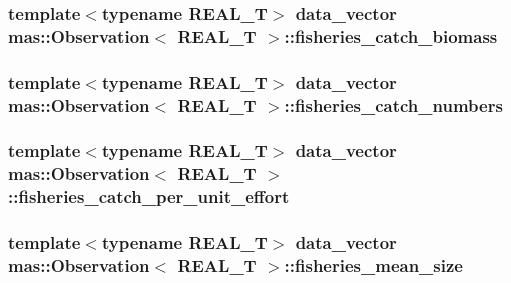 \subsubsection[{fisheries\+\_\+catch\+\_\+biomass}]{\setlength{\rightskip}{0pt plus 5cm}template$<$typename R\+E\+A\+L\+\_\+\+T$>$ data\+\_\+vector {\bf mas\+::\+Observation}$<$ R\+E\+A\+L\+\_\+\+T $>$\+::fisheries\+\_\+catch\+\_\+biomass}\label{classmas_1_1_observation_ace6a30e80477280a5f6f18b79761fb93}
\hypertarget{classmas_1_1_observation_a5ce77924f9fbb0e384ea94d4a0fa224c}{}
\subsubsection[{fisheries\+\_\+catch\+\_\+numbers}]{\setlength{\rightskip}{0pt plus 5cm}template$<$typename R\+E\+A\+L\+\_\+\+T$>$ data\+\_\+vector {\bf mas\+::\+Observation}$<$ R\+E\+A\+L\+\_\+\+T $>$\+::fisheries\+\_\+catch\+\_\+numbers}\label{classmas_1_1_observation_a5ce77924f9fbb0e384ea94d4a0fa224c}
\hypertarget{classmas_1_1_observation_a0aca199b27283dc8d0902dd42e2babc0}{}
\subsubsection[{fisheries\+\_\+catch\+\_\+per\+\_\+unit\+\_\+effort}]{\setlength{\rightskip}{0pt plus 5cm}template$<$typename R\+E\+A\+L\+\_\+\+T$>$ data\+\_\+vector {\bf mas\+::\+Observation}$<$ R\+E\+A\+L\+\_\+\+T $>$\+::fisheries\+\_\+catch\+\_\+per\+\_\+unit\+\_\+effort}\label{classmas_1_1_observation_a0aca199b27283dc8d0902dd42e2babc0}
\hypertarget{classmas_1_1_observation_a5606497a42c83ac55f64f48021c8fa3e}{}
\subsubsection[{fisheries\+\_\+mean\+\_\+size}]{\setlength{\rightskip}{0pt plus 5cm}template$<$typename R\+E\+A\+L\+\_\+\+T$>$ data\+\_\+vector {\bf mas\+::\+Observation}$<$ R\+E\+A\+L\+\_\+\+T $>$\+::fisheries\+\_\+mean\+\_\+size}\label{classmas_1_1_observation_a5606497a42c83ac55f64f48021c8fa3e}
\hypertarget{classmas_1_1_observation_af044bb2c45e00485bd98f70e6d11f470}{}
